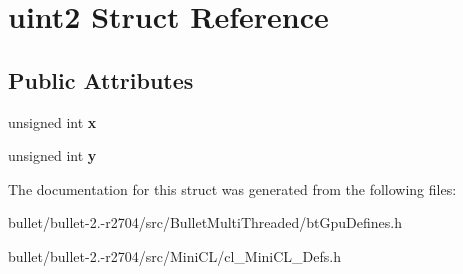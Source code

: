 \hypertarget{structuint2}{\section{uint2 Struct Reference}
\label{structuint2}
}
\subsection*{Public Attributes}
\begin{DoxyCompactItemize}
\item 
\hypertarget{structuint2_a53ddf18749ae199352286b93e76a25e8}{unsigned int {\bfseries x}}\label{structuint2_a53ddf18749ae199352286b93e76a25e8}

\item 
\hypertarget{structuint2_a3271963db8b840c859b8c52bedb016f4}{unsigned int {\bfseries y}}\label{structuint2_a3271963db8b840c859b8c52bedb016f4}

\end{DoxyCompactItemize}


The documentation for this struct was generated from the following files\+:\begin{DoxyCompactItemize}
\item 
bullet/bullet-\/2.-\/r2704/src/\+Bullet\+Multi\+Threaded/bt\+Gpu\+Defines.\+h\item 
bullet/bullet-\/2.-\/r2704/src/\+Mini\+C\+L/cl\+\_\+\+Mini\+C\+L\+\_\+\+Defs.\+h\end{DoxyCompactItemize}
